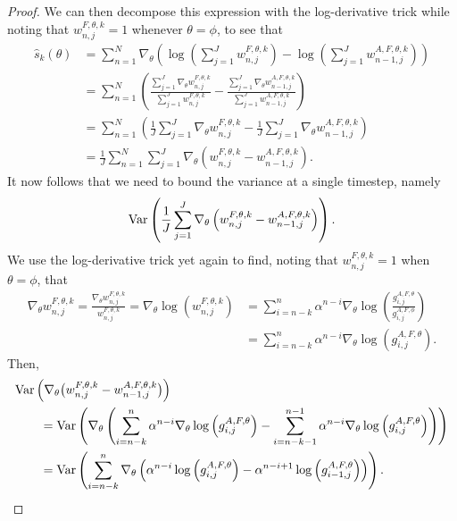 \begin{proof}
We can then decompose this expression with the log-derivative trick while noting that $w_{n,j}^{F,\theta, k} = 1$ whenever $\theta=\phi$, to see that
\begin{align}
    \hat s_k(\theta) 
    &= \sum_{n=1}^N \nabla_\theta \left(\log\left(\sum_{j=1}^J w_{n,j}^{F,\theta, k}\right)-\log\left(\sum_{j=1}^J w_{n-1,j}^{A, F,\theta, k}\right)\right) \\
    &= \sum_{n=1}^N \left(\frac{\sum_{j=1}^J \nabla_\theta w_{n,j}^{F,\theta, k}}{\sum_{j=1}^J w_{n,j}^{F,\theta, k}}-\frac{\sum_{j=1}^J \nabla_\theta w_{n-1,j}^{A,F,\theta, k}}{\sum_{j=1}^J w_{n-1,j}^{A,F,\theta, k}}\right) \\
    &= \sum_{n=1}^N \left(\frac{1}{J}\sum_{j=1}^J \nabla_\theta w_{n,j}^{F,\theta, k}-\frac{1}{J}\sum_{j=1}^J \nabla_\theta w_{n-1,j}^{A,F,\theta, k}\right)\\
    &= \frac{1}{J}\sum_{n=1}^N \sum_{j=1}^J \nabla_\theta \left(w_{n,j}^{F,\theta, k}- w_{n-1,j}^{A,F,\theta, k}\right).
\end{align}
It now follows that we need to bound the variance at a single timestep, namely
\begin{equation}
\mathrm{Var}\left(\frac{1}{J}\sum_{j=1}^J\nabla_\theta \left(w_{n,j}^{F,\theta, k}- w_{n-1,j}^{A,F,\theta, k}\right)\right).
\end{equation}
We use the log-derivative trick yet again to find, noting that $w_{n,j}^{F,\theta, k}=1$ when $\theta=\phi$, that
\begin{align}
    \nabla_\theta w_{n,j}^{F,\theta, k} = \frac{\nabla_\theta w_{n,j}^{F,\theta, k}}{w_{n,j}^{F,\theta, k}} = \nabla_\theta \log(w_{n,j}^{F,\theta, k}) &= \sum_{i=n-k}^n \alpha^{n-i} \nabla_\theta \log\left(\frac{g_{i,j}^{A,F,\theta}}{g_{i,j}^{A,F,\phi}} \right) 
    \\
    &= \sum_{i=n-k}^n \alpha^{n-i} \nabla_\theta \log\left(g_{i,j}^{A,F,\theta}\right).
\end{align}
Then,
\begin{align}
    &\Var\left(\nabla_\theta \big(w_{n,j}^{F,\theta, k}- w_{n-1,j}^{A,F,\theta, k}\big)\right) 
    \\
    &\qquad = \Var\left(\nabla_\theta \left(\sum_{i=n-k}^n \alpha^{n-i} \nabla_\theta \log\left(g_{i,j}^{A,F,\theta}\right)- \sum_{i=n-k-1}^{n-1} \alpha^{n-i} \nabla_\theta \log\left(g_{i,j}^{A,F,\theta}\right)\right)\right) \\
    &\qquad = \Var \left(\sum_{i=n-k}^n \nabla_\theta\left(\alpha^{n-i} \log\left(g_{i,j}^{A,F,\theta}\right)- \alpha^{n-i+1}\log\left(g_{i-1,j}^{A,F,\theta}\right)\right)\right).

\end{align}
\end{proof}
